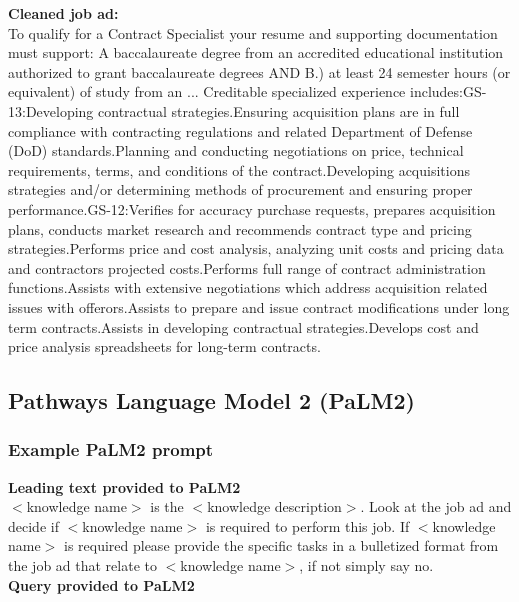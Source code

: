 \documentclass[12pt]{article}
\begin{document}
\noindent \textbf{Cleaned job ad:}\\

To qualify for a Contract Specialist your resume and supporting documentation must support: A baccalaureate degree from an accredited educational institution authorized to grant baccalaureate degrees AND B.) at least 24 semester hours (or equivalent) of study from an ... Creditable specialized experience includes:GS-13:Developing contractual strategies.Ensuring acquisition plans are in full compliance with contracting regulations and related Department of Defense (DoD) standards.Planning and conducting negotiations on price, technical requirements, terms, and conditions of the contract.Developing acquisitions strategies and/or determining methods of procurement and ensuring proper performance.GS-12:Verifies for accuracy purchase requests, prepares acquisition plans, conducts market research and recommends contract type and pricing strategies.Performs price and cost analysis, analyzing unit costs and pricing data and contractors projected costs.Performs full range of contract administration functions.Assists with extensive negotiations which address acquisition related issues with offerors.Assists to prepare and issue contract modifications under long term contracts.Assists in developing contractual strategies.Develops cost and price analysis spreadsheets for long-term contracts.

\newpage

\subsection{Pathways Language Model 2 (PaLM2)}

\subsubsection{Example PaLM2 prompt}\label{sec:palm_prompt}

\textbf{Leading text provided to PaLM2}\\

\noindent $<$knowledge name$>$ is the $<$knowledge description$>$. Look at the job ad and decide if $<$knowledge name$>$ is required to perform this job. If $<$knowledge name$>$ is required please provide the specific tasks in a bulletized format from the job ad that relate to $<$knowledge name$>$, if not simply say no.\\

\noindent \textbf{Query provided to PaLM2}\\
\end{document}

